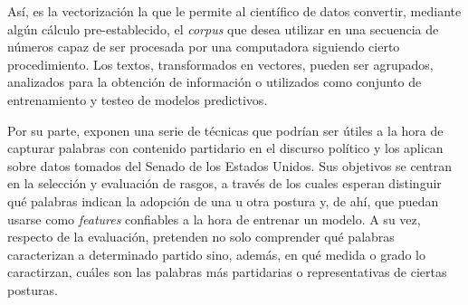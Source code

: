 \par
As\'i, es la vectorizaci\'on la que le permite al cient\'ifico de datos convertir,
mediante alg\'un c\'alculo pre-establecido, el \textit{corpus} que desea
utilizar en una secuencia de n\'umeros capaz de ser
procesada por una computadora siguiendo cierto procedimiento.
Los textos, transformados en vectores, pueden ser agrupados,
analizados para la obtenci\'on de informaci\'on o utilizados
como conjunto de entrenamiento y testeo de modelos predictivos.
\par
Por su parte, \cite{monroe2008fightin} exponen una serie de t\'ecnicas
que podr\'ian ser \'utiles a la hora de capturar palabras con contenido partidario
en el discurso pol\'itico y los aplican sobre datos tomados del Senado de los Estados
Unidos. Sus objetivos se centran en la selecci\'on y evaluaci\'on de rasgos, a trav\'es
de los cuales esperan distinguir qu\'e palabras indican la adopci\'on de una u otra postura
y, de ah\'i, que puedan usarse como \textit{features} confiables a la hora de entrenar un
modelo. A su vez, respecto de la evaluaci\'on, pretenden no solo comprender qu\'e
palabras caracterizan a determinado partido sino, adem\'as, en qu\'e medida o grado
lo caractirzan, cu\'ales son las palabras m\'as partidarias o representativas de ciertas
posturas.
